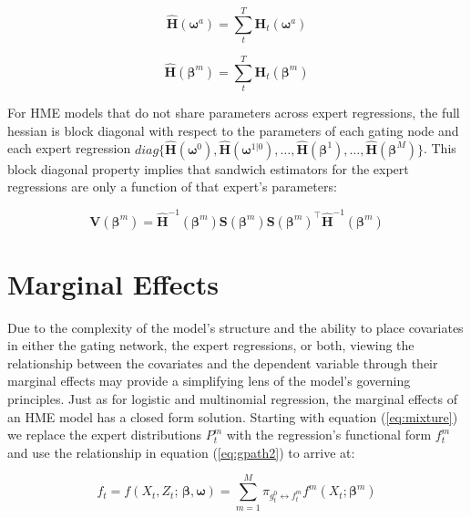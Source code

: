 \documentclass[12pt]{article}
\newcommand{\Ht}[1]{\mathbf{H}_{t}(#1)}
\newcommand{\HH}[1]{\boldsymbol{\hat{H}}(#1)}
\newcommand{\HI}[1]{\boldsymbol{\hat{H}}^{-1}(#1)}
\newcommand{\gateprod}[2]{\pi_{#1 \longleftrightarrow #2}}
\begin{document}
\begin{equation}
  \HH{\boldsymbol{\omega}^{a}} = \sum_{t}^{T} \Ht{\boldsymbol{\omega}^{a}}
\end{equation}


\begin{equation}
  \HH{\boldsymbol{\beta}^{m}} = \sum_{t}^{T} \Ht{\boldsymbol{\beta}^{m}}
\end{equation}

For HME models that do not share parameters across expert regressions, the full
hessian is block diagonal with respect to the parameters of each gating node and
each expert regression
$diag \{ \HH{\boldsymbol{\omega}^{0}}, \HH{\boldsymbol{\omega}^{1|0}}, \ldots, \HH{\boldsymbol{\beta}^{1}}, \ldots, \HH{\boldsymbol{\beta}^{M}} \}$.
This block diagonal property implies that sandwich estimators for the expert
regressions are only a function of that expert's parameters:

\begin{equation}
  \boldsymbol{V}(\boldsymbol{\beta}^{m}) = \HI{\boldsymbol{\beta}^{m}} \boldsymbol{S}(\boldsymbol{\beta}^{m}) \boldsymbol{S}(\boldsymbol{\beta}^{m})^\top \HI{\boldsymbol{\beta}^{m}}
\end{equation}




\section{Marginal Effects} \label{sec:MarginalEffects}

Due to the complexity of the model's structure and the ability to 
place covariates in either the gating network, the expert regressions,
or both, viewing the relationship between the covariates and the dependent
variable through their marginal effects may provide a simplifying lens of the 
model's governing principles. Just as for logistic and multinomial regression,
the marginal effects of an HME model has a closed form solution. Starting
with equation (\ref{eq:mixture}) we replace the expert distributions
$P^{m}_{t}$ with the regression's functional form $f^{m}_{t}$ and use
the relationship in equation (\ref{eq:gpath2}) to arrive at: 

\begin{equation} \label{eq:mixture2}
  f_{t} = f(X_{t}, Z_{t}; \, \boldsymbol{\beta}, \boldsymbol{\omega}) = \sum_{m=1}^{M} \gateprod{g^{0}_{t}}{f^{m}_{t}} f^{m}(X_{t}; \boldsymbol{\beta}^{m})
\end{equation}
\end{document}
